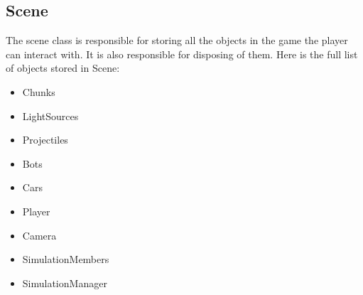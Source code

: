 \subsection{Scene}

The scene class is responsible for storing all the objects in the game the player can interact with.
It is also responsible for disposing of them.
Here is the full list of objects stored in Scene:

\begin{itemize}
    \item Chunks
    \item LightSources
    \item Projectiles
    \item Bots
    \item Cars
    \item Player
    \item Camera
    \item SimulationMembers
    \item SimulationManager
\end{itemize}


